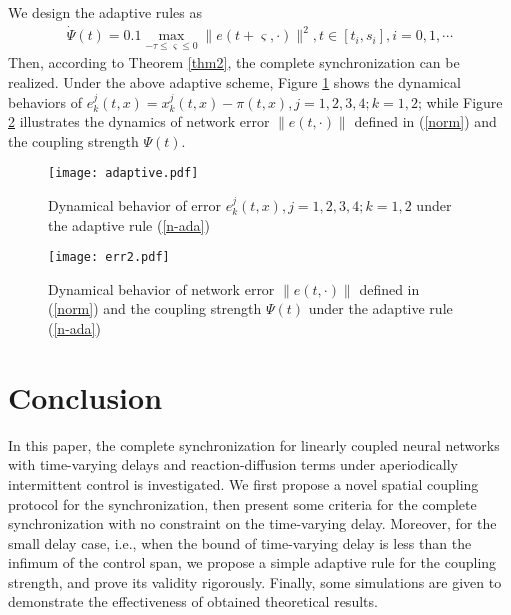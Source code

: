 \documentclass[review]{elsarticle}
\begin{document}
We design the adaptive rules as
\begin{align}\label{n-ada}
\dot{\Psi}(t)=0.1\max\limits_{-{\tau}\leq \varsigma\leq 0}\|e(t+\varsigma,\cdot)\|^2, t\in [t_i,s_i], i=0,1,\cdots
\end{align}
Then, according to Theorem \ref{thm2}, the complete synchronization can be realized. Under the above adaptive scheme, Figure \ref{wf6} shows the dynamical behaviors of $e^j_k(t,x)=x^j_k(t,x)-\pi(t,x), j=1,2,3,4; k=1,2$; while Figure \ref{wf7} illustrates the dynamics of network error $\|e(t,\cdot)\|$ defined in (\ref{norm}) and the coupling strength $\Psi(t)$.

\begin{figure}
\begin{center}
\texttt{[image: adaptive.pdf]}
\end{center}
\caption{Dynamical behavior of error $e^j_k(t,x), j=1,2,3,4; k=1,2$ under the adaptive rule (\ref{n-ada})}\label{wf6}
\end{figure}

\begin{figure}
\begin{center}
\texttt{[image: err2.pdf]}
\end{center}
\caption{Dynamical behavior of network error $\|e(t,\cdot)\|$ defined in (\ref{norm}) and the coupling strength $\Psi(t)$ under the adaptive rule (\ref{n-ada})}\label{wf7}
\end{figure}

\section{Conclusion}\label{conclude}
In this paper, the complete synchronization for linearly coupled neural networks with time-varying delays and reaction-diffusion terms under aperiodically intermittent control is investigated. We first propose a novel spatial coupling protocol for the synchronization, then present some criteria for the complete synchronization with no constraint on the time-varying delay. Moreover, for the small delay case, i.e., when the bound of time-varying delay is less than the infimum of the control span, we propose a simple adaptive rule for the coupling strength, and prove its validity rigorously. Finally, some simulations are given to demonstrate the effectiveness of obtained theoretical results.
\end{document}
